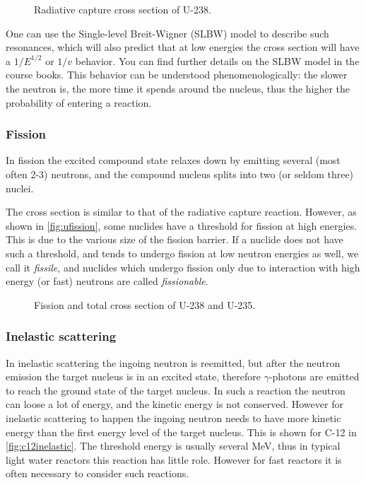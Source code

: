\begin{figure}[ht!]
\protect {}\protect
\caption{\label{fig:u238cap} \footnotesize{Radiative capture cross section of U-238.}}
\end{figure}

One can use the Single-level Breit-Wigner (SLBW) model to describe such resonances, which will also predict that at low energies the cross section will have a $1/E^{1/2}$ or $1/v$ behavior. You can find further details on the SLBW model in the course books. This behavior can be understood phenomenologically: the slower the neutron is, the more time it spends around the nucleus, thus the higher the probability of entering a reaction. 

\subsubsection*{Fission}

In fission the excited compound state relaxes down by emitting several (most often 2-3) neutrons, and the compound nucleus splits into two (or seldom three) nuclei. 

The cross section is similar to that of the radiative capture reaction. However, as shown in \autoref{fig:ufission}, some nuclides have a threshold for fission at high energies. This is due to the various size of the fission barrier. If a nuclide does not have such a threshold, and tends to undergo fission at low neutron energies as well, we call it \textit{fissile}, and nuclides which undergo fission only due to interaction with high energy (or fast) neutrons are called \textit{fissionable}.

\begin{figure}[ht!]
\protect {}\protect
\caption{\label{fig:ufission} \footnotesize{Fission and total cross section of U-238 and U-235.}}
\end{figure}

\subsubsection*{Inelastic scattering}

In inelastic scattering the ingoing neutron is reemitted, but after the neutron emission the target nucleus is in an excited state, therefore $\gamma$-photons are emitted to reach the ground state of the target nucleus. In such a reaction the neutron can loose a lot of energy, and the kinetic energy is not conserved. However for inelastic scattering to happen the ingoing neutron needs to have more kinetic energy than the first energy level of the target nucleus. This is shown for C-12 in \autoref{fig:c12inelastic}. The threshold energy is usually several MeV, thus in typical light water reactors this reaction has little role. However for fast reactors it is often necessary to consider such reactions.

